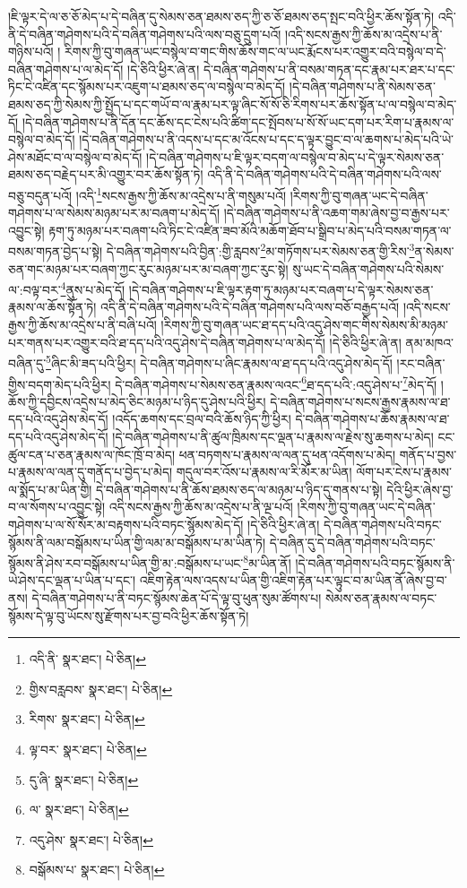 །ཇི་ལྟར་དེ་ལ་ཅ་ཅོ་མེད་པ་དེ་བཞིན་དུ་སེམས་ཅན་ཐམས་ཅད་ཀྱི་ཅ་ཅོ་ཐམས་ཅད་སྤང་བའི་ཕྱིར་ཆོས་སྟོན་ཏེ། འདི་ནི་དེ་བཞིན་གཤེགས་པའི་དེ་བཞིན་གཤེགས་པའི་ལས་བཅུ་དྲུག་པའོ། །འདི་སངས་རྒྱས་ཀྱི་ཆོས་མ་འདྲེས་པ་ནི་གཉིས་པའོ། །
རིགས་ཀྱི་བུ་གཞན་ཡང་བསྙེལ་བ་གང་གིས་ཆོས་གང་ལ་ཡང་རྨོངས་པར་འགྱུར་བའི་བསྙེལ་བ་དེ་བཞིན་གཤེགས་པ་ལ་མེད་དོ། །དེ་ཅིའི་ཕྱིར་ཞེ་ན། དེ་བཞིན་གཤེགས་པ་ནི་བསམ་གཏན་དང་རྣམ་པར་ཐར་པ་དང་ཏིང་ངེ་འཛིན་དང་སྙོམས་པར་འཇུག་པ་ཐམས་ཅད་ལ་བསྙེལ་བ་མེད་དོ། །དེ་བཞིན་གཤེགས་པ་ནི་སེམས་ཅན་ཐམས་ཅད་ཀྱི་སེམས་ཀྱི་སྤྱོད་པ་དང་གཡོ་བ་ལ་རྣམ་པར་ལྟ་ཞིང་སོ་སོ་ཅི་རིགས་པར་ཆོས་སྟོན་པ་ལ་བསྙེལ་བ་མེད་དོ། །དེ་བཞིན་གཤེགས་པ་ནི་དོན་དང་ཆོས་དང་ངེས་པའི་ཚིག་དང་སྤོབས་པ་སོ་སོ་ཡང་དག་པར་རིག་པ་རྣམས་ལ་བསྙེལ་བ་མེད་དོ། །དེ་བཞིན་གཤེགས་པ་ནི་འདས་པ་དང་མ་འོངས་པ་དང་ད་ལྟར་བྱུང་བ་ལ་ཆགས་པ་མེད་པའི་ཡེ་ཤེས་མཐོང་བ་ལ་བསྙེལ་བ་མེད་དོ། །དེ་བཞིན་གཤེགས་པ་ཇི་ལྟར་བདག་ལ་བསྙེལ་བ་མེད་པ་དེ་ལྟར་སེམས་ཅན་ཐམས་ཅད་བརྗེད་པར་མི་འགྱུར་བར་ཆོས་སྟོན་ཏེ། འདི་ནི་དེ་བཞིན་གཤེགས་པའི་དེ་བཞིན་གཤེགས་པའི་ལས་བཅུ་བདུན་པའོ། །འདི་\footnote{འདི་ནི་  སྣར་ཐང་།  པེ་ཅིན། }སངས་རྒྱས་ཀྱི་ཆོས་མ་འདྲེས་པ་ནི་གསུམ་པའོ། །རིགས་ཀྱི་བུ་གཞན་ཡང་དེ་བཞིན་གཤེགས་པ་ལ་སེམས་མཉམ་པར་མ་བཞག་པ་མེད་དོ། །དེ་བཞིན་གཤེགས་པ་ནི་འཆག་གམ་ཞེས་བྱ་བ་རྒྱས་པར་འབྱུང་སྟེ། རྟག་ཏུ་མཉམ་པར་བཞག་པའི་ཏིང་ངེ་འཛིན་ཟབ་མོའི་མཆོག་ཐོབ་པ་སྒྲིབ་པ་མེད་པའི་བསམ་གཏན་ལ་བསམ་གཏན་བྱེད་པ་སྟེ། དེ་བཞིན་གཤེགས་པའི་བྱིན་:གྱི་རླབས་\footnote{གྱིས་བརླབས་  སྣར་ཐང་།  པེ་ཅིན། }མ་གཏོགས་པར་སེམས་ཅན་གྱི་རིས་\footnote{རིགས་  སྣར་ཐང་།  པེ་ཅིན། }ན་སེམས་ཅན་གང་མཉམ་པར་བཞག་ཀྱང་རུང་མཉམ་པར་མ་བཞག་ཀྱང་རུང་སྟེ། སུ་ཡང་དེ་བཞིན་གཤེགས་པའི་སེམས་ལ་:བལྟ་བར་\footnote{ལྟ་བར་  སྣར་ཐང་།  པེ་ཅིན། }ནུས་པ་མེད་དོ། །དེ་བཞིན་གཤེགས་པ་ཇི་ལྟར་རྟག་ཏུ་མཉམ་པར་བཞག་པ་དེ་ལྟར་སེམས་ཅན་རྣམས་ལ་ཆོས་སྟོན་ཏེ། འདི་ནི་དེ་བཞིན་གཤེགས་པའི་དེ་བཞིན་གཤེགས་པའི་ལས་བཅོ་བརྒྱད་པའོ། །འདི་སངས་རྒྱས་ཀྱི་ཆོས་མ་འདྲེས་པ་ནི་བཞི་པའོ། །རིགས་ཀྱི་བུ་གཞན་ཡང་ཐ་དད་པའི་འདུ་ཤེས་གང་གིས་སེམས་མི་མཉམ་པར་གནས་པར་འགྱུར་བའི་ཐ་དད་པའི་འདུ་ཤེས་དེ་བཞིན་གཤེགས་པ་ལ་མེད་དོ། །དེ་ཅིའི་ཕྱིར་ཞེ་ན། ནམ་མཁའ་བཞིན་དུ་\footnote{དུ་ཞི་  སྣར་ཐང་།  པེ་ཅིན། }ཞིང་མི་ཟད་པའི་ཕྱིར། དེ་བཞིན་གཤེགས་པ་ཞིང་རྣམས་ལ་ཐ་དད་པའི་འདུ་ཤེས་མེད་དོ། །རང་བཞིན་གྱིས་བདག་མེད་པའི་ཕྱིར། དེ་བཞིན་གཤེགས་པ་སེམས་ཅན་རྣམས་ལའང་\footnote{ལ་  སྣར་ཐང་།  པེ་ཅིན། }ཐ་དད་པའི་:འདུ་ཤེས་པ་\footnote{འདུ་ཤེས་  སྣར་ཐང་།  པེ་ཅིན། }མེད་དོ། །ཆོས་ཀྱི་དབྱིངས་འདྲེས་པ་མེད་ཅིང་མཉམ་པ་ཉིད་དུ་ཤེས་པའི་ཕྱིར། དེ་བཞིན་གཤེགས་པ་སངས་རྒྱས་རྣམས་ལ་ཐ་དད་པའི་འདུ་ཤེས་མེད་དོ། །འདོད་ཆགས་དང་བྲལ་བའི་ཆོས་ཉིད་ཀྱི་ཕྱིར། དེ་བཞིན་གཤེགས་པ་ཆོས་རྣམས་ལ་ཐ་དད་པའི་འདུ་ཤེས་མེད་དོ། །དེ་བཞིན་གཤེགས་པ་ནི་ཚུལ་ཁྲིམས་དང་ལྡན་པ་རྣམས་ལ་རྗེས་སུ་ཆགས་པ་མེད། ངང་ཚུལ་ངན་པ་ཅན་རྣམས་ལ་ཁོང་ཁྲོ་བ་མེད། ཕན་བཏགས་པ་རྣམས་ལ་ལན་དུ་ཕན་འདོགས་པ་མེད། གནོད་པ་བྱས་པ་རྣམས་ལ་ལན་དུ་གནོད་པ་བྱེད་པ་མེད། གདུལ་བར་འོས་པ་རྣམས་ལ་རི་མོར་མ་ཡིན། ལོག་པར་ངེས་པ་རྣམས་ལ་སྨོད་པ་མ་ཡིན་གྱི། དེ་བཞིན་གཤེགས་པ་ནི་ཆོས་ཐམས་ཅད་ལ་མཉམ་པ་ཉིད་དུ་གནས་པ་སྟེ། དེའི་ཕྱིར་ཞེས་བྱ་བ་ལ་སོགས་པ་འབྱུང་སྟེ། འདི་སངས་རྒྱས་ཀྱི་ཆོས་མ་འདྲེས་པ་ནི་ལྔ་པའོ། །རིགས་ཀྱི་བུ་གཞན་ཡང་དེ་བཞིན་གཤེགས་པ་ལ་སོ་སོར་མ་བརྟགས་པའི་བཏང་སྙོམས་མེད་དོ། །དེ་ཅིའི་ཕྱིར་ཞེ་ན། དེ་བཞིན་གཤེགས་པའི་བཏང་སྙོམས་ནི་ལམ་བསྒོམས་པ་ཡིན་གྱི་ལམ་མ་བསྒོམས་པ་མ་ཡིན་ཏེ། དེ་བཞིན་དུ་དེ་བཞིན་གཤེགས་པའི་བཏང་སྙོམས་ནི་ཤེས་རབ་བསྒོམས་པ་ཡིན་གྱི་མ་:བསྒོམས་པ་ཡང་\footnote{བསྒོམས་པ་  སྣར་ཐང་།  པེ་ཅིན། }མ་ཡིན་ནོ། །དེ་བཞིན་གཤེགས་པའི་བཏང་སྙོམས་ནི་ཡེ་ཤེས་དང་ལྡན་པ་ཡིན་པ་དང་། འཇིག་རྟེན་ལས་འདས་པ་ཡིན་གྱི་འཇིག་རྟེན་པར་ལྟུང་བ་མ་ཡིན་ནོ་ཞེས་བྱ་བ་ནས། དེ་བཞིན་གཤེགས་པ་ནི་བཏང་སྙོམས་ཆེན་པོ་དེ་ལྟ་བུ་ཕུན་སུམ་ཚོགས་པ། སེམས་ཅན་རྣམས་ལ་བཏང་སྙོམས་དེ་ལྟ་བུ་ཡོངས་སུ་རྫོགས་པར་བྱ་བའི་ཕྱིར་ཆོས་སྟོན་ཏེ། 